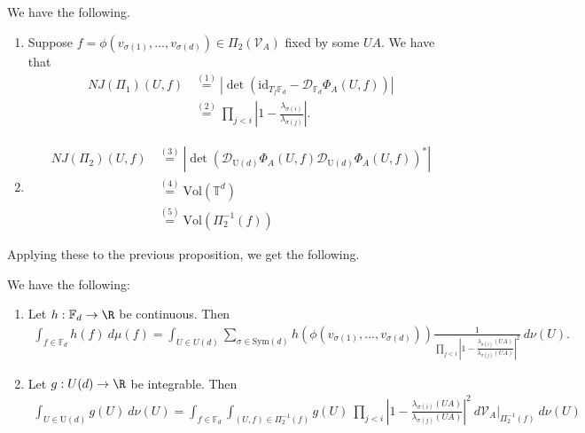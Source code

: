 \documentclass[10pt]{amsart}
\numberwithin{equation}{section}     %
\newcommand{\T}{\mathbb{T}}
\newcommand{\cD}{\mathcal{D}}\newcommand{\cE}{\mathcal{E}}\newcommand{\cF}{\mathcal{F}}
\newcommand{\cV}{\mathcal{V}}\newcommand{\cW}{\mathcal{W}}\newcommand{\cX}{\mathcal{X}}
\newcommand{\Sym}{\mathrm{Sym}}
\newcommand{\FF}{\mathbb{F}}
\newcommand{\U}{\mathrm{U}}
\begin{document}
\begin{proposition} \label{thing}
    We have the following.

    \begin{enumerate}
        \item[a.] 
        Suppose $f = \phi(v_{\sigma(1)},...,v_{\sigma(d)}) \in \Pi_2(\cV_A)$ fixed by some $UA.$ We have that
        \begin{align*}
            NJ(\Pi_1)(U,f) &\overset{(1)}{=} |\det(\mathrm{id}_{T_f\FF_d} - \cD_{\FF_d}\Phi_A(U,f))| \\
            &\overset{(2)}{=} \prod \limits_{j < i} \left| 1 - \frac{\lambda_{\sigma(i)}}{\lambda_{\sigma(j)}}\right|.
        \end{align*}
        \item[b.] 
        \begin{align*}
            NJ(\Pi_2)(U,f) &\overset{(3)}{=} |\det (\cD_{\U(d)} \Phi_A(U,f) \cD_{\U(d)} \Phi_A(U,f) )^*| \\
            &\overset{(4)}{=}\mathrm{Vol}(\T^d)\\
            &\overset{(5)}{=} \mathrm{Vol}(\Pi_2^{-1}(f)) 
        \end{align*}
    \end{enumerate}
\end{proposition}

Applying these to the previous proposition, we get the following. 

\begin{corollary}
    We have the following:
    \begin{enumerate}
        \item Let $h:\FF_d \to \R$ be continuous. Then
        \begin{align}
            \int_{f \in \FF_d} h(f) \ d\mu(f) =
            \int_{U \in U(d)} \sum_{\sigma \in \Sym(d)} h(\phi(v_{\sigma(1)},...,v_{\sigma(d)})) \frac{1}{ \prod \limits_{j < i} \left| 1 - \frac{\lambda_{\sigma(i)}(UA)}{\lambda_{\sigma(j)}(UA)} \right|^{2}} \ d\nu(U).
    \label{almost}
        \end{align}
    \item  
     Let $g: U(d) \to \R$ be integrable. Then 
        \begin{align}
        \int_{U \in \U(d)} g(U) \ d\nu(U) =
        \int_{f \in \FF_d} \int_{(U,f) \in \Pi_2^{-1}(f)} g(U) \ \prod \limits_{j < i} \left| 1 - \frac{\lambda_{\sigma(i)}(UA)}{\lambda_{\sigma(j)}(UA)} \right|^{2} \ d\cV_A|_{\Pi_2^{-1}(f)} \ d\nu(U) \label{the equivalent}
        \end{align}
    \end{enumerate}
\end{corollary}
\end{document}
